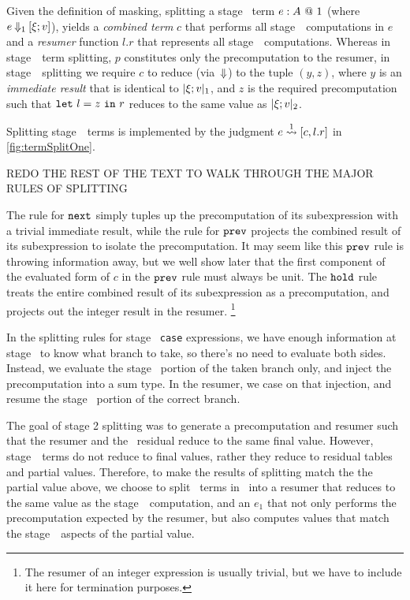 Given the definition of masking, splitting a stage \bbone\ term ${e}:{A}~@~ 1$ 
(where $e\mathbin{{\Downarrow_{ 1}}}[\xi;v]$), yields a \emph{combined term}
$c$ that performs all stage~\bbone\ computations in $e$ and a \emph{resumer} function $l.r$ that represents all stage~\bbtwo\ computations.
Whereas in stage~\bbtwo\ term splitting,
$p$ constitutes only the precomputation to the resumer, in stage~\bbone\ splitting we require $c$ to reduce (via~${\Downarrow}$) to the tuple $(y,z)$, where $y$ is an \emph{immediate result} that is identical to $|\xi;v|_{ 1}$, and $z$ is the required precomputation such that ${\tt let}~{l} = {z}~{\tt in}~{r}$ reduces to the same value as $|\xi;v|_{ 2}$. 

Splitting stage~\bbone\ terms is implemented by the judgment $e \overset{ 1}\rightsquigarrow [c,l.r]$ in \ref{fig:termSplitOne}. 




\TODO REDO THE REST OF THE TEXT TO WALK THROUGH THE MAJOR RULES OF SPLITTING

The rule for ${\tt next}$ simply tuples up the precomputation of its subexpression with a trivial immediate result,
while the rule for ${\tt prev}$ projects the combined result of its subexpression to isolate the precomputation.
It may seem like this ${\tt prev}$ rule is throwing information away, but we well show later that the first component 
of the evaluated form of $c$ in the ${\tt prev}$ rule must always be unit.
The ${\tt hold}$ rule treats the entire combined result of its subexpression as a precomputation, 
and projects out the integer result in the resumer.%
\footnote{The resumer of an integer expression is usually trivial, 
but we have to include it here for termination purposes.}

In the splitting rules for stage \bbone\ {\tt case} expressions, we
have enough information at stage \bbone\ to know what branch to take, so there's
no need to evaluate both sides. Instead, we evaluate the stage \bbone\ portion of the
taken branch only, and inject the precomputation into a sum type. In the
resumer, we case on that injection, and resume the stage \bbtwo\ portion of the
correct branch.

The goal of stage 2 splitting was to generate a precomputation and resumer such
that the resumer and the \lang\ residual reduce to the same final value.
However, stage~\bbone\ terms do not reduce to final values, rather they reduce
to residual tables and partial values.  
Therefore, to make the results of splitting match the
the partial value above, we choose to split \bbone\ terms in \lang\ into a
resumer that reduces to the same value as the stage~\bbtwo\ computation, and an
$e_1$ that not only performs the precomputation expected by the resumer, but
also computes values that match the stage~\bbone\ aspects of the partial value.


